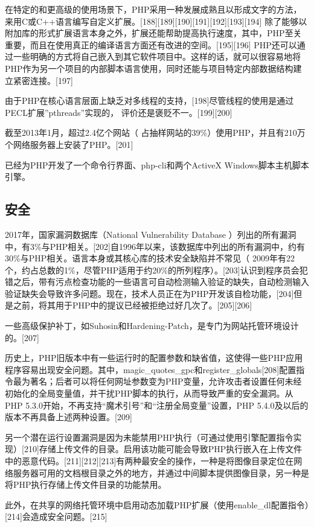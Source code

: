 在特定的和更高级的使用场景下，PHP采用一种发展成熟且以形成文字的方法，来用C或C++语言编写自定义扩展。[188][189][190][191][192][193][194] 除了能够以附加库的形式扩展语言本身之外，扩展还能帮助提高执行速度，其中，PHP至关重要，而且在使用真正的编译语言方面还有改进的空间。[195][196] PHP还可以通过一些明确的方式将自己嵌入到其它软件项目中。这样的话，就可以很容易地将PHP作为另一个项目的内部脚本语言使用，同时还能与项目特定内部数据结构建立紧密连接。[197]

由于PHP在核心语言层面上缺乏对多线程的支持，[198]尽管线程的使用是通过PECL扩展”pthreads”实现的， 评价还是褒贬不一。[199][200]

截至2013年1月，超过2.4亿个网站（ 占抽样网站的39\%）使用PHP，并且有210万个网络服务器上安装了PHP。[201]

已经为PHP开发了一个命令行界面、php-cli和两个ActiveX Windows脚本主机脚本引擎。

\subsection{安全}
2017年，国家漏洞数据库（National Vulnerability Database ）列出的所有漏洞中，有3\%与PHP相关。[202]自1996年以来，该数据库中列出的所有漏洞中，约有30\%与PHP相关。语言本身或其核心库的技术安全缺陷并不常见（ 2009年有22个，约占总数的1\%，尽管PHP适用于约20\%的所列程序）。[203]认识到程序员会犯错之后，带有污点检查功能的一些语言可自动检测输入验证的缺失，自动检测输入验证缺失会导致许多问题。现在，技术人员正在为PHP开发该自检功能，[204]但是之前，将其用于PHP中的提议已经被拒绝过好几次了。[205][206]

一些高级保护补丁，如Suhosin和Hardening-Patch，是专门为网站托管环境设计的。[207]

历史上，PHP旧版本中有一些运行时的配置参数和缺省值，这使得一些PHP应用程序容易出现安全问题。其中，magic_quotes_gpc和register_globals[208]配置指令最为著名；后者可以将任何网址参数变为PHP变量，允许攻击者设置任何未经初始化的全局变量值，并干扰PHP脚本的执行，从而导致严重的安全漏洞。从PHP 5.3.0开始，不再支持“魔术引号”和“注册全局变量”设置，PHP 5.4.0及以后的版本不再具备上述两种设置。[209]

另一个潜在运行设置漏洞是因为未能禁用PHP执行（可通过使用引擎配置指令实现）[210]存储上传文件的目录。启用该功能可能会导致PHP执行嵌入在上传文件中的恶意代码。[211][212][213]有两种最安全的操作，一种是将图像目录定位在网络服务器可用的文档根目录之外的地方，并通过中间脚本提供图像目录，另一种是将PHP执行存储上传文件目录的功能禁用。

此外，在共享的网络托管环境中启用动态加载PHP扩展（使用enable_dl配置指令）[214]会造成安全问题。[215]


